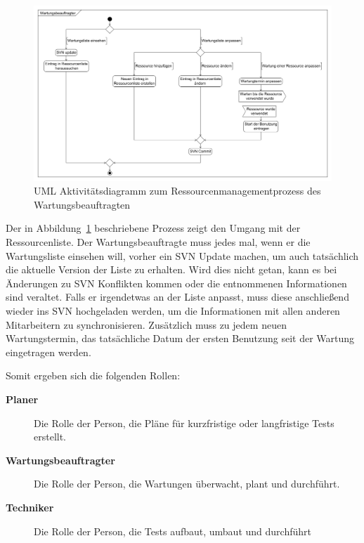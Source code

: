 \begin{figure}[H]
    \includegraphics[width=\linewidth]{diagramme/WartungsbeauftragterProzess.png}
    \caption{UML Aktivitätsdiagramm zum Ressourcenmanagementprozess des Wartungsbeauftragten}\label{fig:WarterProzess}
\end{figure}

Der in Abbildung~\ref{fig:WarterProzess} beschriebene Prozess zeigt den Umgang mit der 
Ressourcenliste. Der Wartungsbeauftragte muss jedes mal, wenn er die Wartungsliste
einsehen will, vorher ein \gls{SVN} Update machen, um auch tatsächlich die aktuelle
Version der Liste zu erhalten. Wird dies nicht getan, kann es bei Änderungen 
zu \gls{SVN} Konflikten kommen oder die entnommenen Informationen sind veraltet.
Falls er irgendetwas an der Liste anpasst, muss diese anschließend wieder ins 
\gls{SVN} hochgeladen werden, um die Informationen mit allen anderen Mitarbeitern
zu synchronisieren. Zusätzlich muss zu jedem neuen Wartungstermin, das tatsächliche
Datum der ersten Benutzung seit der Wartung eingetragen werden.

Somit ergeben sich die folgenden Rollen:

\begin{description}
    \item[\textbf{Planer}] Die Rolle der Person, die Pläne für kurzfristige oder
    langfristige Tests erstellt.

    \item[\textbf{Wartungsbeauftragter}] Die Rolle der Person, die Wartungen 
    überwacht, plant und durchführt. 

    \item[\textbf{Techniker}] Die Rolle der Person, die Tests aufbaut, umbaut und
    durchführt
\end{description}

